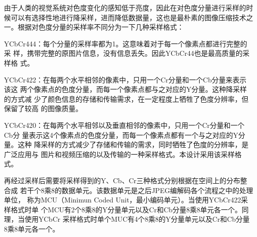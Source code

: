 \documentclass{article}
\numberwithin {equation}{section}
\begin{document}
\begin{spacing}{1.25}
    由于人类的视觉系统对色度变化的感知低于亮度，因此在对色度分量进行采样的时
    候可以有选择性地进行降采样，进而降低数据量，这也是最朴素的图像压缩技术之
    一。根据对色度分量的采样率不同分为一下几种采样格式：
     
    YCbCr444：每个分量的采样率都为1。这意味着对于每一个像素点都进行完整的采
    样，携带完整的原图片信息，没有信息丢失。因此YCbCr44也是最高质量的采样格
    式。

    YCbCr422：在每两个水平相邻的像素中，只用一个Cr分量和一个Cb分量来表示该这
    两个像素点的色度分量，而每一个像素点都与之对应的Y分量。这种降采样的方式减
    少了颜色信息的存储和传输需求，在一定程度上牺牲了色度分辨率，但保留了较高
    的图像质量。

    YCbCr420：在每两个水平相邻以及垂直相邻的像素中，只用一个Cr分量和一个Cb分
    量表示这4个像素点的色度分量，而每一个像素点都有一个与之对应的Y分量。这种
    降采样的方式减少了存储和传输的需求，同时牺牲了色度的分辨率，是广泛应用与
    图片和视频压缩的以及传输的一种采样格式。本设计采用该采样格式。

    再经过采样后需要将采样得到的Y、Cb、Cr三种格式分别根据在空间上的分布整合成
    若干个8乘8的数据单元。该数据单元是之后JPEG编解码各个流程之中的处理单位，
    称为MCU（Minimun Coded Unit，最小编码单元）。当使用YCbCr422采样格式时单
    个MCU有2个8乘8的Y分量单元以及Cr和Cb分量8乘8单元各一个。同理，当使用YCbCr
    采样格式时单个MUC有4个8乘8的Y分量单元以及Cr和Cb分量8乘8单元各一个。

\end{spacing}
\end{document}
